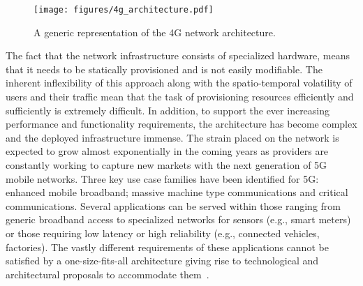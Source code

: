 \documentclass[journal,comsoc]{IEEEtran}
\begin{document}
% 
\begin{figure}[t]
	\centering	
	\texttt{[image: figures/4g\_architecture.pdf]}
	\caption{A generic representation of the 4G network architecture.}
    \label{fig:4g_architecture}
    \vspace{-4mm}
\end{figure}





% 
The fact that the network infrastructure consists of specialized hardware, means that it needs to be statically provisioned and is not easily modifiable. 
The inherent inflexibility of this approach along with the spatio-temporal volatility of users and their traffic mean that the task of provisioning resources efficiently and sufficiently is extremely difficult.
In addition, to support the ever increasing performance and functionality requirements, the architecture has become complex and the deployed infrastructure immense. 
The strain placed on the network is expected to grow almost exponentially in the coming years as providers are constantly working to capture new markets with the next generation of 5G mobile networks.
Three key use case families have been identified for 5G: enhanced mobile broadband; massive machine type communications and critical communications.
Several applications can be served within those ranging from generic broadband access to specialized networks for sensors (e.g., smart meters) or those requiring low latency or high reliability (e.g., connected vehicles, factories). 
The vastly different requirements of these applications cannot be satisfied by a one-size-fits-all architecture giving rise to technological and architectural proposals to accommodate them~\cite{5gppp, tr_ngmn_5gwhitepaper, itu_imt2020, foukas2017mcom}.
\end{document}
